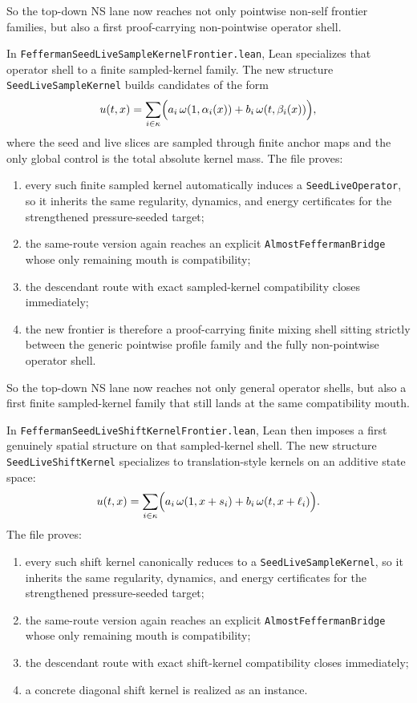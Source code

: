 \documentclass[11pt]{article}
\begin{document}
So the top-down NS lane now reaches not only pointwise non-self frontier
families, but also a first proof-carrying non-pointwise operator shell.

In \texttt{FeffermanSeedLiveSampleKernelFrontier.lean}, Lean specializes that
operator shell to a finite sampled-kernel family.  The new structure
\texttt{SeedLiveSampleKernel} builds candidates of the form
\[
u(t,x) = \sum_{i \in \kappa}
  \Bigl(a_i \, \omega(1,\alpha_i(x)) + b_i \, \omega(t,\beta_i(x))\Bigr),
\]
where the seed and live slices are sampled through finite anchor maps and the
only global control is the total absolute kernel mass.  The file proves:
\begin{enumerate}[leftmargin=1.5em]
  \item every such finite sampled kernel automatically induces a
  \texttt{SeedLiveOperator}, so it inherits the same regularity, dynamics, and
  energy certificates for the strengthened pressure-seeded target;
  \item the same-route version again reaches an explicit
  \texttt{AlmostFeffermanBridge} whose only remaining mouth is compatibility;
  \item the descendant route with exact sampled-kernel compatibility closes
  immediately;
  \item the new frontier is therefore a proof-carrying finite mixing shell
  sitting strictly between the generic pointwise profile family and the fully
  non-pointwise operator shell.
\end{enumerate}

So the top-down NS lane now reaches not only general operator shells, but also a
first finite sampled-kernel family that still lands at the same compatibility
mouth.

In \texttt{FeffermanSeedLiveShiftKernelFrontier.lean}, Lean then imposes a first
genuinely spatial structure on that sampled-kernel shell.  The new structure
\texttt{SeedLiveShiftKernel} specializes to translation-style kernels on an
additive state space:
\[
u(t,x) = \sum_{i \in \kappa}
  \Bigl(a_i \, \omega(1, x + s_i) + b_i \, \omega(t, x + \ell_i)\Bigr).
\]
The file proves:
\begin{enumerate}[leftmargin=1.5em]
  \item every such shift kernel canonically reduces to a
  \texttt{SeedLiveSampleKernel}, so it inherits the same regularity, dynamics,
  and energy certificates for the strengthened pressure-seeded target;
  \item the same-route version again reaches an explicit
  \texttt{AlmostFeffermanBridge} whose only remaining mouth is compatibility;
  \item the descendant route with exact shift-kernel compatibility closes
  immediately;
  \item a concrete diagonal shift kernel is realized as an instance.
\end{enumerate}
\end{document}
